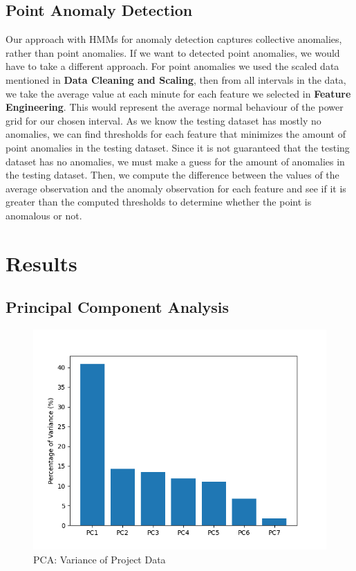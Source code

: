 \documentclass[11pt]{article}
\begin{document}
  \subsection{Point Anomaly Detection}
  Our approach with HMMs for anomaly detection captures collective anomalies, rather 
  than point anomalies. 
  If we want to detected point anomalies, we would have to take a different approach.
  For point anomalies we used the scaled data mentioned in \textbf{Data Cleaning and Scaling},
  then from all intervals in the data, we take the average value at each minute 
  for each feature we selected in \textbf{Feature Engineering}.
  This would represent the average normal behaviour of the power grid for our chosen interval.
  As we know the testing dataset has mostly no anomalies, we can find thresholds 
  for each feature that minimizes the amount of point anomalies in the testing dataset.
  Since it is not guaranteed that the testing dataset has no anomalies, we must make a 
  guess for the amount of anomalies in the testing dataset.
  Then, we compute the difference between the values of the average observation 
  and the anomaly observation for each feature and see if it is greater than the computed 
  thresholds to determine whether the point is anomalous or not.

\section{Results}

\subsection{Principal Component Analysis}
\begin{figure}[H]
  \centering
  \includegraphics[scale=0.7, trim=15 20 30 40, clip]{../images/PCA_Variance.png}
  \caption{PCA: Variance of Project Data}
\end{figure}
\end{document}
